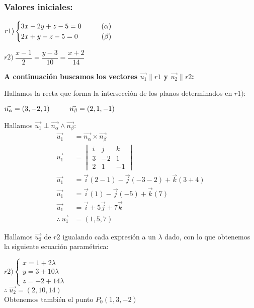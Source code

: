 \subsubsection*{Valores iniciales:}

\begin{multicols}{2}
	$r1)
		\begin{cases}
			3x - 2y + z - 5 = 0 \hspace{1cm} (\alpha) \\
			2x + y - z - 5 = 0  \hfill (\beta)
		\end{cases}$

	$r2) \ \dfrac{x - 1}{2} = \dfrac{y - 3}{10} = \dfrac{x + 2}{14}$
\end{multicols}

\noindent \textbf{A continuación buscamos los vectores $\vec{u_1} \parallel r1$ y $\vec{u_2} \parallel r2$:}

\noindent Hallamos la recta que forma la intersección de los planos determinados en $r1)$:

\begin{center}
	$\vec{n_{\alpha}} = (3, -2, 1) \hspace*{1cm} \vec{n_{\beta}} = (2, 1, -1)$

\end{center}

\noindent Hallamos $\vec{u_1} \perp \vec{n_{\alpha}} \land \vec{n_{\beta}}$:
\begin{align*}
	\vec{u_1}              & = \vec{n_{\alpha}} \times \vec{n_{\beta}}          \\
	\vec{u_1}              & = \begin{vmatrix}
		                           i & j  & k  \\
		                           3 & -2 & 1  \\
		                           2 & 1  & -1
	                           \end{vmatrix}                                   \\
	\vec{u_1}              & = \vec{i}(2 - 1) - \vec{j}(-3 -2) + \vec{k}(3 + 4) \\
	\vec{u_1}              & = \vec{i}(1) - \vec{j}(-5) + \vec{k}(7)            \\
	\vec{u_1}              & = \vec{i} + 5\vec{j} + 7\vec{k}                    \\
	\therefore \ \vec{u_1} & = \boxed{(1, 5, 7)}
\end{align*}

\noindent Hallamos $\vec{u_2}$ de $r2$ igualando cada expresión a un $\lambda$ dado, con lo que obtenemos la siguiente ecuación paramétrica:

\begin{center}
	$r2)
		\begin{cases}
			x = 1 + 2\lambda  \\
			y = 3 + 10\lambda \\
			z = -2 + 14\lambda
		\end{cases}$ \\
	\vspace{0.3cm}
	\noindent $\therefore \ \boxed{\vec{u_2} = (2, 10, 14)}$  \\
	\vspace{0.3cm}
	Obtenemos también el punto $P_0(1,3,-2)$
\end{center}

